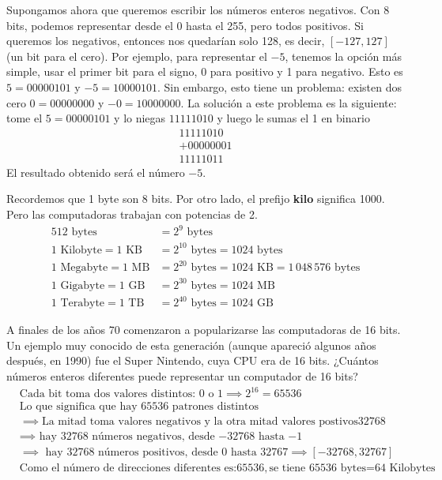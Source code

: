 \documentclass[12pt]{article}
\begin{document}
Supongamos ahora que queremos escribir los números enteros negativos. 
Con 8 bits, podemos representar desde el 0 hasta el 255, pero todos positivos. 
Si queremos los negativos, entonces nos quedarían solo 128, es decir, $[-127,127]$ (un bit
para el cero).
Por ejemplo, para representar el $-5$, tenemos la opción más simple, usar el primer bit
para el signo, 0 para positivo y 1 para negativo. Esto es $5 = 00000101$ y  $-5 = 1000 0101$.
Sin embargo, esto tiene un problema: existen dos cero $0 = 00000000$ y $-0=10000000$.
La solución a este problema es la siguiente: tome el $5 = 00000101$ y lo niegas $11111010$ y 
luego le sumas el 1 en binario 
\[
\begin{array}{r}
  11111010 \\
+ 00000001 \\
\hline
  11111011
\end{array}
\] 
El resultado obtenido será el número $-5$. 

\begin{cajaflex}
Recordemos que 1 byte son 8 bits. Por otro lado, el prefijo
\textbf{kilo} significa 1000. Pero las computadoras trabajan con potencias de 2. 
\begin{align*}
	512 \text{ bytes} &= 2^9 \text{ bytes} \\
	1 \text{ Kilobyte} =1 \text{ KB} &= 2^{10} \text{ bytes} = 1024 \text{ bytes} \\
	1 \text{ Megabyte} =1 \text{ MB} &= 2^{20} \text{ bytes} = 1024 \text{ KB} = 1\,048\,576 \text{ bytes} \\
	1 \text{ Gigabyte} =1 \text{ GB} &= 2^{30} \text{ bytes} = 1024 \text{ MB} \\
	1 \text{ Terabyte} =1 \text{ TB} &= 2^{40} \text{ bytes} = 1024 \text{ GB} 
\end{align*}
\end{cajaflex}

A finales de los años 70 comenzaron a popularizarse las computadoras de 16 bits. 
Un ejemplo muy conocido de esta generación (aunque apareció algunos años después, en 1990)
fue el Super Nintendo, cuya CPU era de 16 bits.
¿Cuántos números enteros diferentes puede representar un computador de 16 bits?
\begin{align*}
&\text{Cada bit toma dos valores distintos: 0 o 1}  \implies  2^{16} = 65536  \\ 
&\text{Lo que significa que hay 65536 patrones distintos} \\ 
&\implies \text{La mitad toma valores negativos y la otra mitad valores postivos} 32768 \\
& \implies  \text{ hay 32768 números negativos, desde −32768 hasta −1} \\
& \implies  \text{ hay 32768 números positivos, desde 0 hasta 32767} \implies [-32768, 32767]\\
&\text{Como el número de direcciones diferentes es:} 65536,
\text{se tiene 65536 bytes=} 64 \text{ Kilobytes} 
\end{align*}
\end{document}
